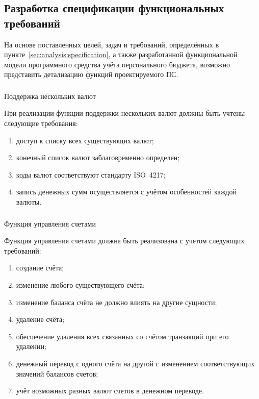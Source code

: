 \subsection{Разработка спецификации функциональных требований}
\label{sec:domain:specification}

На основе поставленных целей, задач и требований, определённых в пункте~\ref{sec:analysis:specification}, а также разработанной функциональной модели программного средства учёта персонального бюджета, возможно представить детализацию функций проектируемого ПС.

\subsubsection{} Поддержка нескольких валют
\label{sec:domain:specification:currencies}

При реализации функции поддержки нескольких валют должны быть учтены следующие требования:

\begin{enumerate}
    \item доступ к списку всех существующих валют;
    \item конечный список валют заблаговременно определен;
    \item коды валют соответствуют стандарту ISO~4217;
    \item запись денежных сумм осуществляется с учётом особенностей каждой валюты.
\end{enumerate}

\subsubsection{} Функция управления счетами
\label{sec:domain:specification:wallets}

Функция управления счетами должна быть реализована с учетом следующих требований:

\begin{enumerate}
    \item создание счёта;
    \item изменение любого существующего счёта;
    \item изменение баланса счёта не должно влиять на другие сущности;
    \item удаление счёта;
    \item обеспечение удаления всех связанных со счётом транзакций при его удалении;
    \item денежный перевод с одного счёта на другой с изменением соответствующих значений балансов счетов;
    \item учёт возможных разных валют счетов в денежном переводе.
\end{enumerate}

